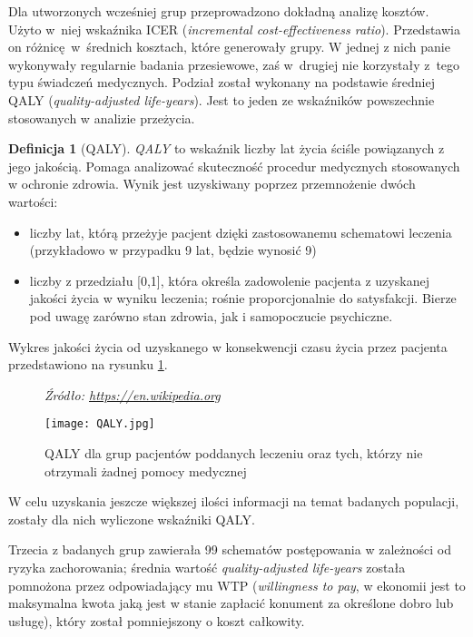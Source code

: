 \documentclass[licencjacka]{pwr_wmat_praca_dyplomowa}
\theoremstyle{plain}
\numberwithin{theorem}{chapter}
\theoremstyle{definition}
\numberwithin{theorem}{chapter}
\newtheorem{definition}[theorem]{Definicja}
\begin{document}
Dla utworzonych wcześniej grup przeprowadzono dokładną analizę kosztów. Użyto w~niej wskaźnika ICER (\textit{incremental cost-effectiveness ratio}). Przedstawia on różnicę~w~średnich kosztach, które generowały grupy. W jednej z nich panie wykonywały regularnie badania przesiewowe, zaś w~drugiej nie korzystały z~tego typu świadczeń medycznych. Podział został wykonany na podstawie średniej QALY (\textit{quality-adjusted life-years}). Jest to jeden ze wskaźników powszechnie stosowanych w analizie przeżycia.
\begin{definition}[QALY]
	\textit{QALY} to wskaźnik liczby lat życia ściśle powiązanych z jego jakością. Pomaga analizować skuteczność procedur medycznych stosowanych w ochronie zdrowia.  Wynik jest uzyskiwany poprzez przemnożenie dwóch wartości:
	\begin{itemize}
		\item liczby lat, którą przeżyje pacjent dzięki zastosowanemu schematowi leczenia (przykładowo w przypadku 9 lat, będzie wynosić 9)
		\item liczby z przedziału [0,1], która określa zadowolenie pacjenta z uzyskanej jakości życia w wyniku leczenia; rośnie proporcjonalnie do satysfakcji. Bierze pod uwagę zarówno stan zdrowia, jak i samopoczucie psychiczne.
	\end{itemize}

Wykres jakości życia od uzyskanego w konsekwencji czasu życia przez pacjenta przedstawiono na rysunku \ref{rys1}.

\begin{figure}[h]
	\caption*{\textit{Źródło: \url{https://en.wikipedia.org}}}
	\centering
	
	\texttt{[image: QALY.jpg]}
	\caption{QALY dla grup pacjentów poddanych leczeniu oraz tych, którzy nie otrzymali żadnej pomocy medycznej}\label{rys1}
	
\end{figure}
 

\end{definition}


W celu uzyskania jeszcze większej ilości informacji na temat badanych populacji, zostały dla nich wyliczone wskaźniki QALY.

Trzecia z badanych grup zawierała 99 schematów postępowania w zależności od ryzyka zachorowania; średnia wartość \textit{quality-adjusted life-years} została pomnożona przez odpowiadający mu WTP (\textit{willingness to pay}, w ekonomii jest to maksymalna kwota jaką jest w stanie zapłacić konument za określone dobro lub usługę), który został pomniejszony o koszt całkowity. 
\end{document}
